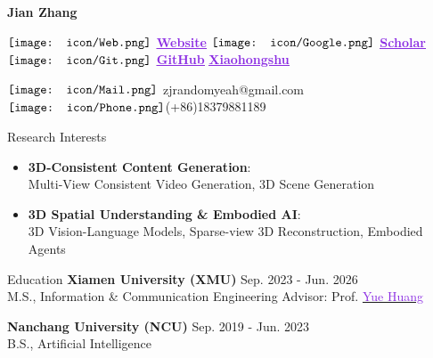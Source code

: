 \documentclass{resume} %
\newcommand*\git{\vcenter{\hbox{\texttt{[image: icon/Git.png]}}}}
\newcommand*\Google{\vcenter{\hbox{\texttt{[image: icon/Google.png]}}}}
\newcommand*\web{\vcenter{\hbox{\texttt{[image: icon/Web.png]}}}}
\newcommand*\email{\vcenter{\hbox{\texttt{[image: icon/Mail.png]}}}}
\newcommand*\phone{\vcenter{\hbox{\texttt{[image: icon/Phone.png]}}}}
\begin{document}
\begin{vwcol}[widths={0.4,0.6}, sep=.8cm, justify=flush,rule=0pt,indent=1em] 
\huge{\textbf{Jian Zhang}}

\small $\web$ \href{https://jian-zhang-3dv.github.io/Jian-Zhang-3DV/}{\textcolor{BlueViolet}{\underline{\textbf{Website}}}} 
\hspace{0mm} $\Google$ \href{https://scholar.google.com/citations?user=qBNtBsAAAAAJ&hl=en&oi=sra}{\textcolor{BlueViolet}{\bf \underline{Scholar}}} \hspace{0mm} $\git$ \href{https://github.com/Jian-Zhang-3DV}{\textcolor{BlueViolet}{\bf \underline{GitHub}}} \hspace{0mm} \href{https://www.xiaohongshu.com/user/profile/599e002e82ec39105af73220}{\textcolor{BlueViolet}{\bf \underline{Xiaohongshu}}}

$\email$ zjrandomyeah@gmail.com \hspace{0mm} $\phone$(+86)18379881189
\end{vwcol} 

\vspace{-0.7mm}
\begin{rSection}{Research Interests}
\vspace{-1mm}
\begin{itemize}[leftmargin=1.5em, itemsep=-0.5mm]
    \item \textbf{3D-Consistent Content Generation}: 
    \\ \small Multi-View Consistent Video Generation, 3D Scene Generation
    \item \textbf{3D Spatial Understanding \& Embodied AI}: 
    \\ \small 3D Vision-Language Models, Sparse-view 3D Reconstruction, Embodied Agents
\end{itemize}
\end{rSection}

\vspace{-1.5mm}

\begin{rSection}{Education}
\vspace{-0mm}
\vspace{-1mm}
{\bf Xiamen University (XMU)} \hfill Sep. 2023 - Jun. 2026
\\ M.S., Information \& Communication Engineering 
\hfill Advisor: Prof. \href{https://huangyue05.github.io/}{\textcolor{BlueViolet}{Yue Huang}}

\vspace{-1mm}
{\bf Nanchang University (NCU)} \hfill Sep. 2019 - Jun. 2023
\\ B.S., Artificial Intelligence

\end{rSection}
\end{document}
